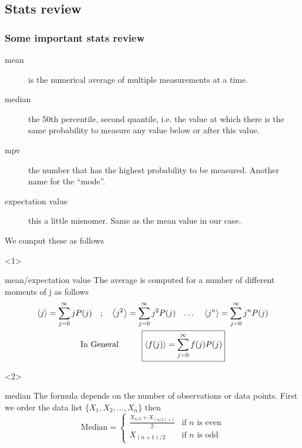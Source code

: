 \subsection{Stats review}

\begin{frame}
    \frametitle{Some important stats review}
\begin{description}
    \item[mean] is the numerical average of multiple measurements at a time.
    \item[median] the 50th percentile, second quantile, i.e. the value at which there
    is the same probability to measure any value below or after this value.
    \item[mpv] the number that has the highest probability to be measured.
    Another name for the ``mode''.
    \item[expectation value]  this a little misnomer. Same as the mean value in our case.
\end{description}
We comput these as follows

\begin{onlyenv}<1>

    \begin{block}{mean/expectation value}
        The average is computed for a number of different moments of j as follows
        \begin{gather}
            \ev{j}= \sum_{j=0}^\infty j P(j) \qq{;} \ev{j^2} = \sum_{j=0}^\infty j^2 P(j) \qq{\dots} \ev{j^n} = \sum_{j=0}^\infty j^n P(j)\\
           \text{In General} \hspace{1cm} \boxed{\ev{f(j)} = \sum_{j=0}^\infty f(j) P(j)}
        \end{gather}

    \end{block}

\end{onlyenv}

\begin{onlyenv}<2>

    \begin{block}{median}
        The formula depends on the number of observations or data points. First we order the data list
        $\{X_1, X_2, \dots, X_n\}$ then
        \[
        \text{Median} =
        \begin{cases}
            \frac{X_{n/2} + X_{(n/2)+1}}{2} & \text{if } n \text{ is even} \\
            X_{(n+1)/2} & \text{if } n \text{ is odd}
        \end{cases}
        \]

    \end{block}

\end{onlyenv}

\end{frame}


